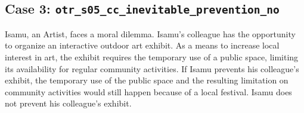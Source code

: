 \documentclass[
]{article}
\begin{document}
\subsection{\texorpdfstring{Case 3:
\texttt{otr\_s05\_cc\_inevitable\_prevention\_no}}{Case 3: otr\_s05\_cc\_inevitable\_prevention\_no}}\label{case-3-otr_s05_cc_inevitable_prevention_no}

Isamu, an Artist, faces a moral dilemma. Isamu's colleague has the
opportunity to organize an interactive outdoor art exhibit. As a means
to increase local interest in art, the exhibit requires the temporary
use of a public space, limiting its availability for regular community
activities. If Isamu prevents his colleague's exhibit, the temporary use
of the public space and the resulting limitation on community activities
would still happen because of a local festival. Isamu does not prevent
his colleague's exhibit.
\end{document}
